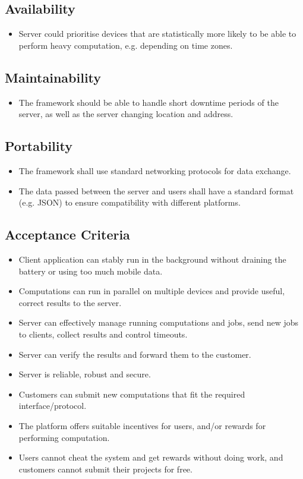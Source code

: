 \documentclass[a4paper,10pt]{article}
\begin{document}
\subsection{Availability}

\begin{itemize}
	\item Server could prioritise devices that are statistically more likely to be able to perform heavy computation, e.g. depending on time zones.

\end{itemize} 

\subsection{Maintainability}

\begin{itemize}
	\item The framework should be able to handle short downtime periods of the server, as well as the server changing location and address.

\end{itemize} 

\subsection{Portability}

\begin{itemize}
	\item The framework shall use standard networking protocols for data exchange.
	\item The data passed between the server and users shall have a standard format (e.g. JSON) to ensure compatibility with different platforms.
\end{itemize} 

\subsection{Acceptance Criteria}

\begin{itemize}
	\item Client application can stably run in the background without draining the battery or using too much mobile data.
	\item Computations can run in parallel on multiple devices and provide useful, correct results to the server.
	\item Server can effectively manage running computations and jobs, send new jobs to clients, collect results and control timeouts.
	\item Server can verify the results and forward them to the customer.
	\item Server is reliable, robust and secure.
	\item Customers can submit new computations that fit the required interface/protocol.
	\item The platform offers suitable incentives for users, and/or rewards for performing computation.
	\item Users cannot cheat the system and get rewards without doing work, and customers cannot submit their projects for free.
\end{itemize}
\end{document}
